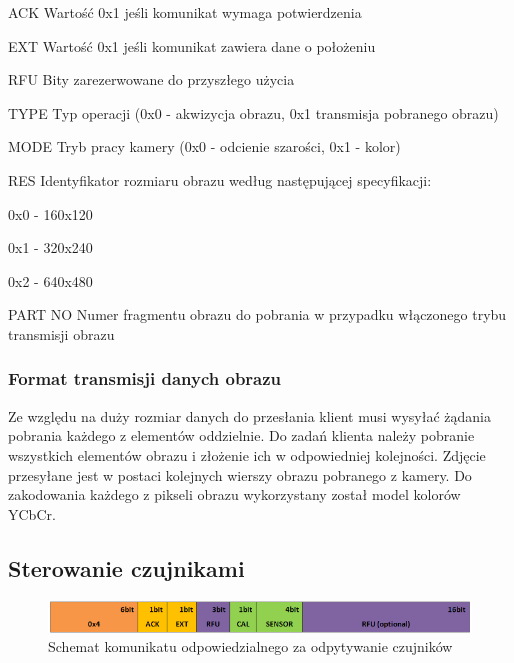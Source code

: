 \begin{basedescript}{\desclabelstyle{\pushlabel}\desclabelwidth{25mm}}
\setlength{\parsep}{0pt}
\setlength{\itemsep}{0mm}
\setlength{\parskip}{0pt}
\item[ACK]
	Wartość 0x1 jeśli komunikat wymaga potwierdzenia
\item[EXT] 
	Wartość 0x1 jeśli komunikat zawiera dane o położeniu
\item[RFU] 
	Bity zarezerwowane do przyszłego użycia
\item[TYPE] 
	Typ operacji (0x0 - akwizycja obrazu, 0x1 transmisja pobranego obrazu)
\item[MODE] 
	Tryb pracy kamery (0x0 - odcienie szarości, 0x1 - kolor)
\item[RES] 
	Identyfikator rozmiaru obrazu według następującej specyfikacji:
	\begin{desc}
	\item[0x0] - 160x120
	\item[0x1] - 320x240
	\item[0x2] - 640x480
	\end{desc} 
\item[PART NO] 
	Numer fragmentu obrazu do pobrania w przypadku włączonego trybu transmisji
	obrazu
\end{basedescript}

\subsubsection{Format transmisji danych obrazu}
Ze względu na duży rozmiar danych do przesłania klient musi wysyłać
żądania pobrania każdego z elementów oddzielnie. Do zadań klienta należy
pobranie wszystkich elementów obrazu i złożenie ich w odpowiedniej kolejności.
Zdjęcie przesyłane jest w postaci kolejnych wierszy obrazu pobranego z kamery.
Do zakodowania każdego z pikseli obrazu wykorzystany został model kolorów YCbCr. 

\subsection{Sterowanie czujnikami}
\begin{figure}[h!] 
 \centering
 \includegraphics[width=\textwidth]{../images/appendix/cmd_0x04.png}
 \caption{Schemat komunikatu odpowiedzialnego za odpytywanie czujników}
 \label{fig:CMD_0x04}
\end{figure}

